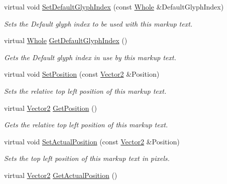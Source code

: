 \begin{DoxyCompactItemize}
virtual void \hyperlink{classphys_1_1UI_1_1MarkupText_ac4571478569a161f919d6439c4f8d1d2}{SetDefaultGlyphIndex} (const \hyperlink{namespacephys_a460f6bc24c8dd347b05e0366ae34f34a}{Whole} \&DefaultGlyphIndex)
\begin{DoxyCompactList}\small\item\em Sets the Default glyph index to be used with this markup text. \item\end{DoxyCompactList}\item 
virtual \hyperlink{namespacephys_a460f6bc24c8dd347b05e0366ae34f34a}{Whole} \hyperlink{classphys_1_1UI_1_1MarkupText_a02872d0b9828b34e9b2ceec82cce237b}{GetDefaultGlyphIndex} ()
\begin{DoxyCompactList}\small\item\em Gets the Default glyph index in use by this markup text. \item\end{DoxyCompactList}\item 
virtual void \hyperlink{classphys_1_1UI_1_1MarkupText_a7ab3316271d5b08005f7555b397e0fca}{SetPosition} (const \hyperlink{classphys_1_1Vector2}{Vector2} \&Position)
\begin{DoxyCompactList}\small\item\em Sets the relative top left position of this markup text. \item\end{DoxyCompactList}\item 
virtual \hyperlink{classphys_1_1Vector2}{Vector2} \hyperlink{classphys_1_1UI_1_1MarkupText_a9d92f03e1cad181a5d8f20f3f95cf7cc}{GetPosition} ()
\begin{DoxyCompactList}\small\item\em Gets the relative top left position of this markup text. \item\end{DoxyCompactList}\item 
virtual void \hyperlink{classphys_1_1UI_1_1MarkupText_acb44480453d2228e0f1a7bcd77a0bd17}{SetActualPosition} (const \hyperlink{classphys_1_1Vector2}{Vector2} \&Position)
\begin{DoxyCompactList}\small\item\em Sets the top left position of this markup text in pixels. \item\end{DoxyCompactList}\item 
virtual \hyperlink{classphys_1_1Vector2}{Vector2} \hyperlink{classphys_1_1UI_1_1MarkupText_a1e5bfba8d1686cb4188793fd695c7090}{GetActualPosition} ()

\end{DoxyCompactItemize}
